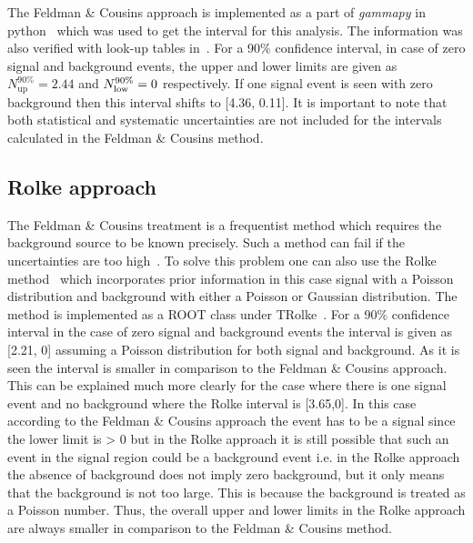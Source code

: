 The Feldman \& Cousins approach is implemented as a part of \textit{gammapy} in python~\cite{Gammapy:2023gvb} which was used to get the interval for this analysis. The information was also verified with look-up tables in~\cite{Feldman:1997qc}. For a 90\% confidence interval, in case of zero signal and background events, the upper and lower limits are given as $N^{90\%}_{\text{up}} = 2.44$ and $N^{90\%}_{\text{\text{low}}} = 0$ respectively. If one signal event is seen with zero background then this interval shifts to [4.36, 0.11]. It is important to note that both statistical and systematic uncertainties are not included for the intervals calculated in the Feldman \& Cousins method. 

\subsection{Rolke approach}
\label{subsec:Rolke}
The Feldman \& Cousins treatment is a frequentist method which requires the background source to be known precisely. Such a method can fail if the uncertainties are too high~\cite{Rolke:2000ij}. To solve this problem one can also use the Rolke method~\cite{Rolke:2004mj} which incorporates prior information in this case signal with a Poisson distribution and background with either a Poisson or Gaussian distribution. The method is implemented as a ROOT class under TRolke~\cite{TRolke_ROOT}. For a 90\% confidence interval in the case of zero signal and background events the interval is given as [2.21, 0] assuming a Poisson distribution for both signal and background. As it is seen the interval is smaller in comparison to the Feldman \& Cousins approach. This can be explained much more clearly for the case where there is one signal event and no background where the Rolke interval is [3.65,0]. In this case according to the Feldman \& Cousins approach the event has to be a signal since the lower limit is > 0 but in the Rolke approach it is still possible that such an event in the signal region could be a background event i.e. in the Rolke approach the absence of background does not imply zero background, but it only means that the background is not too large. This is because the background is treated as a Poisson number. Thus, the overall upper and lower limits in the Rolke approach are always smaller in comparison to the Feldman \& Cousins  method. 

